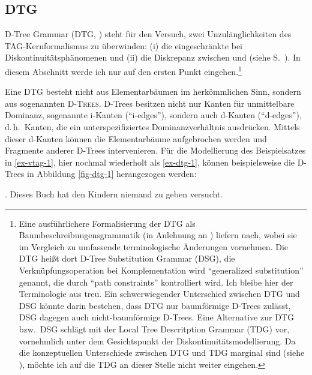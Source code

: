 \subsection{DTG} \label{sec-dtg}

D-Tree Grammar (DTG, \citealt{Rambow:etal:95}) steht für den Versuch, zwei Unzulänglichkeiten des TAG-Kernformalismus zu überwinden: (i) die eingeschränkte  bei Diskontinuitätsphänomenen und (ii) die Diskrepanz zwischen  und  (siehe S.~\pageref{sec-ableitungsbaum}). In diesem Abschnitt werde ich nur auf den ersten Punkt eingehen.\footnote{Eine ausführlichere Formalisierung der DTG als Baumbeschreibungensgrammatik (in Anlehnung an \citealt{Vijay-Shanker:92}) liefern \cite{Rambow:etal:01} nach, wobei sie im Vergleich zu \cite{Rambow:etal:95} umfassende terminologische Änderungen vornehmen. Die DTG hei\ss t dort D-Tree Substitution Grammar (DSG), die Verknüpfungsoperation bei Komplementation wird "`generalized substitution"' genannt, die durch "`path constraints"' kontrolliert wird. Ich bleibe hier der Terminologie aus \cite{Rambow:etal:95} treu. Ein schwerwiegender Unterschied zwischen DTG und DSG könnte darin bestehen, dass DTG nur baumförmige D-Trees zulässt, DSG dagegen auch nicht-baumförmige D-Trees. Eine Alternative zur DTG bzw.\ DSG schlägt \cite{Kallmeyer:01} mit der Local Tree Descritption Grammar (TDG) vor, vornehmlich unter dem Gesichtspunkt der Diskontinuitätsmodellierung. Da die konzeptuellen Unterschiede zwischen DTG und TDG marginal sind (siehe \citealt[118]{Rambow:etal:01}), möchte ich auf die TDG an dieser Stelle nicht weiter eingehen.}

Eine DTG besteht nicht aus Elementarbäumen im herkömmlichen Sinn, sondern aus sogenannten \textsc{D-Trees}. D-Trees besitzen nicht nur Kanten für unmittelbare Dominanz, sogenannte i-Kanten ("`i-edges"'), sondern auch d-Kanten ("`d-edges"'), d.\,h.\ Kanten, die ein unterspezifiziertes Dominanzverhältnis ausdrücken. Mittels dieser d-Kanten können die Elementarbäume aufgebrochen werden und Fragmente anderer D-Trees intervenieren. Für die Modellierung des Beispielsatzes in \ref{ex-vtag-1}, hier nochmal wiederholt als \ref{ex-dtg-1}, können beispielsweise die D-Trees in Abbildung \ref{fig-dtg-1} herangezogen werden: 

\ex. {Dieses Buch} hat {den Kindern} niemand {zu geben} versucht. \label{ex-dtg-1}

